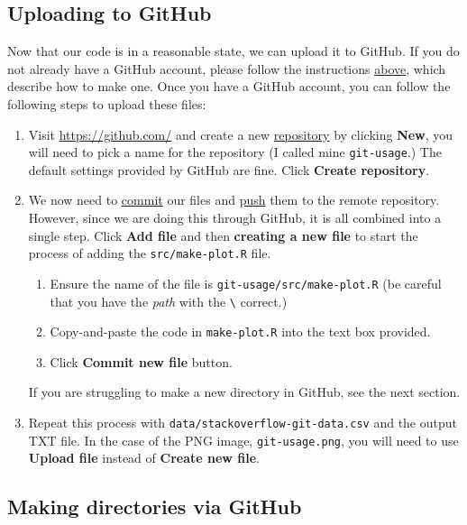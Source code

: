 \documentclass[11pt,onecolumn]{scrartcl}
\begin{document}
\subsection{Uploading to GitHub}
\label{sec:orgc114d0e}

Now that our code is in a reasonable state, we can upload it to GitHub. If you
do not already have a GitHub account, please follow the instructions \hyperref[sec:org04f462a]{above},
which describe how to make one. Once you have a GitHub account, you can follow
the following steps to upload these files:

\begin{enumerate}
\item Visit \url{https://github.com/} and create a new \hyperref[sec:org9185b51]{repository} by clicking \textbf{New}, you
will need to pick a name for the repository (I called mine \texttt{git-usage}.) The
default settings provided by GitHub are fine. Click \textbf{Create repository}.
\item We now need to \hyperref[sec:orgf8649b1]{commit} our files and \hyperref[sec:org80ed38b]{push} them to the remote repository.
However, since we are doing this through GitHub, it is all combined into a
single step. Click \textbf{Add file} and then \textbf{creating a new file} to start the
process of adding the \texttt{src/make-plot.R} file.
\begin{enumerate}
\item Ensure the name of the file is \texttt{git-usage/src/make-plot.R} (be careful
that you have the \emph{path} with the \texttt{\textbackslash{}} correct.)
\item Copy-and-paste the code in \texttt{make-plot.R} into the text box provided.
\item Click \textbf{Commit new file} button.
\end{enumerate}
If you are struggling to make a new directory in GitHub, see the next
section.
\item Repeat this process with \texttt{data/stackoverflow-git-data.csv} and the output TXT
file. In the case of the PNG image, \texttt{git-usage.png}, you will need to use
\textbf{Upload file} instead of \textbf{Create new file}.
\end{enumerate}

\subsection{Making directories via GitHub}
\label{sec:org5ac81cb}
\end{document}
